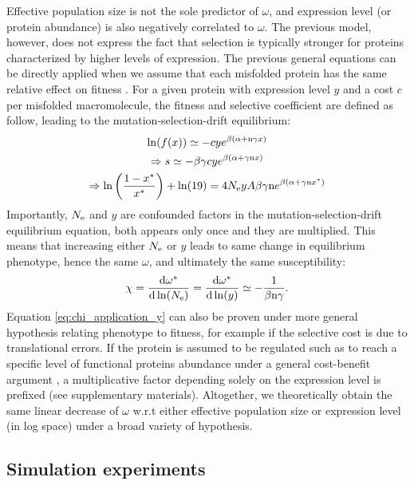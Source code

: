 \documentclass{MBE}%
\begin{document}
Effective population size is not the sole predictor of $\omega$, and expression level (or protein abundance) is also negatively correlated to $\omega$. 
The previous model, however, does not express the fact that selection is typically stronger for proteins characterized by higher levels of expression.
The previous general equations can be directly applied when we assume that each misfolded protein has the same relative effect on fitness \citep{Drummond2005a, Wilke2006, Drummond2008, Serohijos2012}. 
For a given protein with expression level $y$ and a cost $c$ per misfolded macromolecule, the fitness and selective coefficient are defined as follow, leading to the mutation-selection-drift equilibrium:
\begin{gather}
\ln (f(x)) \simeq - c y e^{\beta (\alpha + \text{n} \gamma x)} \\
\Rightarrow s  \simeq - \beta \gamma c y e^{\beta(\alpha + \gamma \text{n} x)} \\
\Rightarrow \ln \left( \frac{1 - x^{*}}{x^{*}} \right) + \ln (19) = 4N_{\mathrm{e}} y A \beta \gamma \text{n} e^{\beta(\alpha + \gamma \text{n} x^{*})}
\end{gather}
Importantly, $N_{\mathrm{e}}$ and $y$ are confounded factors in the mutation-selection-drift equilibrium equation, both appears only once and they are multiplied.
This means that increasing either $N_{\mathrm{e}}$ or $y$ leads to same change in equilibrium phenotype, hence the same $\omega$, and ultimately the same susceptibility:
\begin{align}
\chi = \frac{ \der \omega\eq}{\der \ln (\Ne)} = \frac{ \der \omega\eq}{\der \ln (y)} \simeq - \frac{1}{\beta \Nsite \gamma}. \label{eq:chi_application_y}
\end{align}
Equation \ref{eq:chi_application_y} can also be proven under more general hypothesis relating phenotype to fitness, for example if the selective cost is due to translational errors.
If the protein is assumed to be regulated such as to reach a specific level of functional proteins abundance under a general cost-benefit argument \citep{Cherry2010,Gout2010}, a multiplicative factor depending solely on the expression level is prefixed (see supplementary materials).
Altogether, we theoretically obtain the same linear decrease of $\omega$ w.r.t either effective population size or expression level (in log space) under a broad variety of hypothesis.

\subsection*{Simulation experiments}
\end{document}
